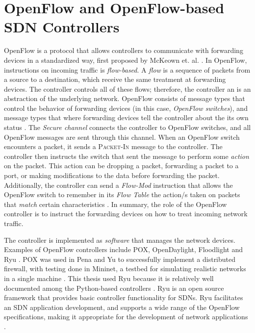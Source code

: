 \section{OpenFlow and OpenFlow-based SDN Controllers}
OpenFlow is a protocol that allows controllers to communicate with forwarding devices in a standardized way, first proposed by McKeown et. al. \cite{mckeown_openflow_2008}. In OpenFlow, instructions on incoming traffic is \textit{flow-based}. A \textit{flow} is a sequence of packets from a source to a destination, which receive the same treatment at forwarding devices. The controller controls all of these flows; therefore, the controller an is an abstraction of the underlying network. OpenFlow consists of message types that control the behavior of forwarding devices (in this case, \textit{OpenFlow switches}), and message types that where forwarding devices tell the controller about the its own status \cite{open_networking_foundation_openflow_2009}. The \textit{Secure channel} connects the controller to OpenFlow switches, and all OpenFlow messages are sent through this channel. When an OpenFlow switch encounters a packet, it sends a \textsc{Packet-In} message to the controller. The controller then instructs the switch that sent the message to perform some \textit{action} on the packet. This action can be dropping a packet, forwarding a packet to a port, or making modifications to the data before forwarding the packet. Additionally, the controller can send a \textit{Flow-Mod} instruction that allows the OpenFlow switch to remember in its \textit{Flow Table} the action/s taken on packets that \textit{match} certain characteristics \cite{open_networking_foundation_openflow_2009}. In summary, the role of the OpenFlow controller is to instruct the forwarding devices on how to treat incoming network traffic.

The controller is implemented as \textit{software} that manages the network devices. Examples of OpenFlow controllers include  POX, OpenDaylight, Floodlight and Ryu \cite{salman_sdn_2016}. POX was used in Pena and Yu \cite{pena_development_2014} to successfully implement a distributed firewall, with testing done in Mininet, a testbed for simulating realistic networks in a single machine \cite{noauthor_mininet_nodate}. This thesis used Ryu because it is relatively well documented among the Python-based controllers \cite{salman_sdn_2016}. Ryu is an open source framework that provides basic controller functionality for SDNs. Ryu facilitates an SDN application development, and supports a wide range of the OpenFlow specifications, making it appropriate for the development of network applications \cite{kubo_ryu_2014}. 


